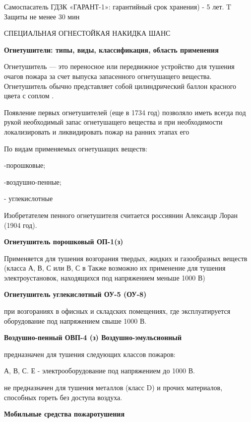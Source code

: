 \documentclass[a4paper, 12pt]{article}
\theoremstyle{definition}
\begin{document}
        Самоспасатель ГДЗК «ГАРАНТ-1»: 
        гарантийный срок хранения) - 5 лет. T Защиты не менее 30 мин

        СПЕЦИАЛЬНАЯ ОГНЕСТОЙКАЯ НАКИДКА ШАНС

        \begin{center}
            \textbf{Огнетушители: типы, виды, классификация, область применения} 
        \end{center}

        Огнетушитель — это переносное или передвижное устройство для тушения очагов пожара за счет выпуска запасенного огнетушащего вещества. Огнетушитель обычно представляет собой цилиндрический баллон красного цвета с соплом .

        Появление первых огнетушителей (еще в 1734 год) позволяло иметь всегда под рукой необходимый запас огнетушащего вещества и при необходимости локализировать и ликвидировать пожар на ранних этапах его

        По видам применяемых огнетушащих веществ:

        -порошковые; 

        -воздушно-пенные;   

        - углекислотные

        Изобретателем пенного огнетушителя считается россиянин Александр Лоран (1904 год).

        \textbf{Огнетушитель порошковый ОП-1(з)} 

        Применяется для тушения возгорания твердых, жидких и газообразных веществ (класса А, В, С или В, С в Также возможно их применение для тушения электроустановок, находящихся под напряжением меньше 1000 В)

        \textbf{Огнетушитель углекислотный ОУ-5 (ОУ-8)}
        
        при возгораниях в офисных и складских помещениях, где эксплуатируется оборудование  под напряжением свыше 1000 В.

        \textbf{Воздушно-пенный ОВП-4 (з)
        Воздушно-эмульсионный}
        
        предназначен для тушения следующих классов пожаров:

        А, В, С. Е - электрооборудование под напряжением до 1000 В.

        не предназначен для тушения металлов (класс D) и прочих материалов, способных гореть без доступа воздуха.

        \textbf{Мобильные средства пожаротушения}
        
\end{document}
